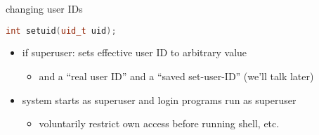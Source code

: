 
\begin{frame}[fragile,label=setuid]{changing user IDs}
\begin{lstlisting}[language=C++,style=small]
int setuid(uid_t uid);
\end{lstlisting}
\begin{itemize}
    \item if superuser: sets effective user ID to arbitrary value
        \begin{itemize}
        \item and a ``real user ID'' and a ``saved set-user-ID'' (we'll talk later)
        \end{itemize}
    \vspace{.5cm}
    \item system starts as superuser and login programs run as superuser
        \begin{itemize}
        \item voluntarily restrict own access before running shell, etc.
        \end{itemize}
\end{itemize}
\end{frame}

